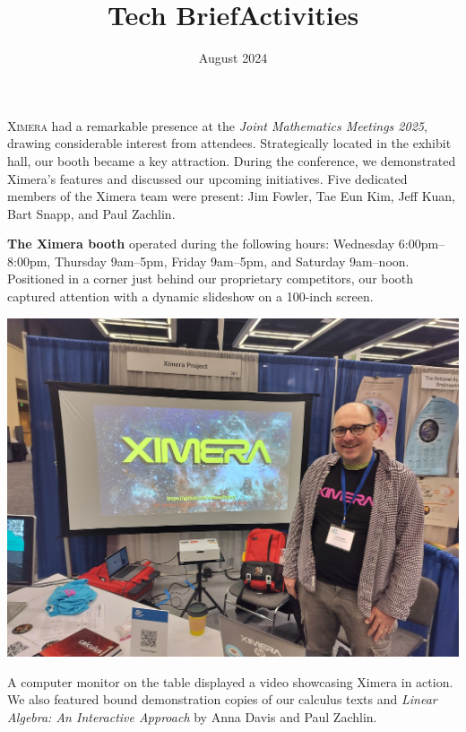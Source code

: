 \documentclass{techbrief}
\title{Tech Brief}
\title{Activities}
\date{August 2024}
\begin{document}
\pagestyle{main}
\thispagestyle{title}
\noindent

\lettrine[lines=2]{X}{imera} had a remarkable presence at the \textit{Joint
    Mathematics Meetings 2025}, drawing considerable interest from attendees.
Strategically located in the exhibit hall, our booth became a key attraction.
During the conference, we demonstrated Ximera's features and discussed our
upcoming initiatives. Five dedicated members of the Ximera team were present:
Jim Fowler, Tae Eun Kim, Jeff Kuan, Bart Snapp, and Paul Zachlin.

\begin{xframe}
    {\textbf{The Ximera booth}} operated during the following hours: Wednesday
    6:00pm--8:00pm, Thursday 9am--5pm, Friday 9am--5pm, and Saturday 9am--noon.
    Positioned in a corner just behind our proprietary competitors, our booth
    captured attention
    with a dynamic slideshow on a 100-inch screen.
    \begin{center}
        \includegraphics[width=.9\textwidth]{booth.jpg}
    \end{center}
    A computer monitor on the table displayed a video showcasing Ximera in
    action. We also featured bound demonstration copies of our calculus texts
    and
    \textit{Linear Algebra: An Interactive Approach} by Anna Davis and Paul
    Zachlin. 
\end{xframe}
\end{document}
